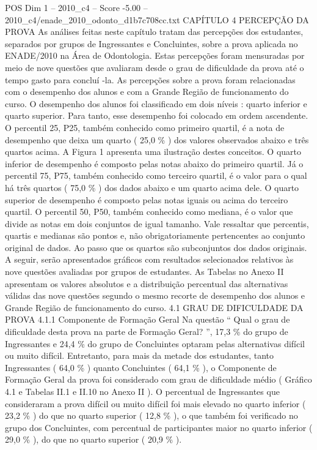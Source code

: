 \begin{textsample}{POS Dim 1 – 2010\_c4 – Score -5.00 – 2010\_c4/enade\_2010\_odonto\_d1b7c708cc.txt}  \label{ex:f1_pos_402}
CAPÍTULO 4 PERCEPÇÃO DA PROVA As análises feitas neste capítulo tratam das percepções dos estudantes, separados por grupos de Ingressantes e Concluintes, sobre a prova aplicada no ENADE/2010 na Área de Odontologia.
Estas percepções foram mensuradas por meio de nove questões que avaliaram desde o grau de dificuldade da prova até o tempo gasto para concluí -la.
As percepções sobre a prova foram relacionadas com o desempenho dos alunos e com a Grande Região de funcionamento do curso.
O desempenho dos alunos foi classificado em dois níveis : quarto inferior e quarto superior.
Para tanto, esse desempenho foi colocado em ordem ascendente.
O percentil 25, P25, também conhecido como primeiro quartil, é a nota de desempenho que deixa um quarto ( 25,0 \% ) dos valores observados abaixo e três quartos acima.
A Figura 1 apresenta uma ilustração destes conceitos.
O quarto inferior de desempenho é composto pelas notas abaixo do primeiro quartil.
Já o percentil 75, P75, também conhecido como terceiro quartil, é o valor para o qual há três quartos ( 75,0 \% ) dos dados abaixo e um quarto acima dele.
O quarto superior de desempenho é composto pelas notas iguais ou acima do terceiro quartil.
O percentil 50, P50, também conhecido como mediana, é o valor que divide as notas em dois conjuntos de igual tamanho.
Vale ressaltar que percentis, quartis e medianas são pontos e, não obrigatoriamente pertencentes ao conjunto original de dados.
Ao passo que os quartos são subconjuntos dos dados originais.
A seguir, serão apresentados gráficos com resultados selecionados relativos às nove questões avaliadas por grupos de estudantes.
As Tabelas no Anexo II apresentam os valores absolutos e a distribuição percentual das alternativas válidas das nove questões segundo o mesmo recorte de desempenho dos alunos e Grande Região de funcionamento do curso. 4.1 GRAU DE DIFICULDADE DA PROVA 4.1.1 Componente de Formação Geral Na questão “ Qual o grau de dificuldade desta prova na parte de Formação Geral? ”, 17,3 \% do grupo de Ingressantes e 24,4 \% do grupo de Concluintes optaram pelas alternativas difícil ou muito difícil.
Entretanto, para mais da metade dos estudantes, tanto Ingressantes ( 64,0 \% ) quanto Concluintes ( 64,1 \% ), o Componente de Formação Geral da prova foi considerado com grau de dificuldade médio ( Gráfico 4.1 e Tabelas II.1 e II.10 no Anexo II ).
O percentual de Ingressantes que consideraram a prova difícil ou muito difícil foi mais elevado no quarto inferior ( 23,2 \% ) do que no quarto superior ( 12,8 \% ), o que também foi verificado no grupo dos Concluintes, com percentual de participantes maior no quarto inferior ( 29,0 \% ), do que no quarto superior ( 20,9 \% ).

\end{textsample}
